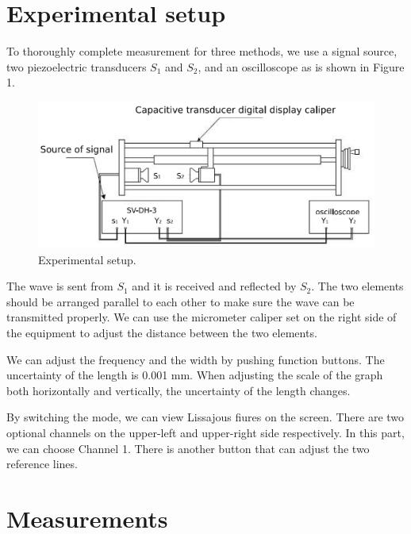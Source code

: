\documentclass[a4paper]{report}
\begin{document}
	\section{Experimental setup}
	To thoroughly complete measurement for three methods, we use a signal source, two piezoelectric transducers $S_1$ and $S_2$, and an oscilloscope as is shown in Figure 1.
	\begin{figure}[H]
		\centering
		\includegraphics[width=0.8\linewidth]{1.png}
		\caption{Experimental setup.}
		\label{fig:1}
	\end{figure}
	The wave is sent from $S_1$ and it is received and reflected by $S_2$. The two elements should be arranged parallel to each other to make sure the wave can be transmitted properly. We can use the micrometer caliper set on the right side of the equipment to adjust the distance between the two elements.
	
	We can adjust the frequency and the width by pushing function buttons. The uncertainty of the length is 0.001 mm. When adjusting the scale of the graph both horizontally and vertically, the uncertainty of the length changes.
	
	By switching the mode, we can view Lissajous fiures on the screen. There are two optional channels on the upper-left and upper-right side respectively. In this part, we can choose Channel 1. There is another button that can adjust the two reference lines.
	\section{Measurements}
\end{document}
